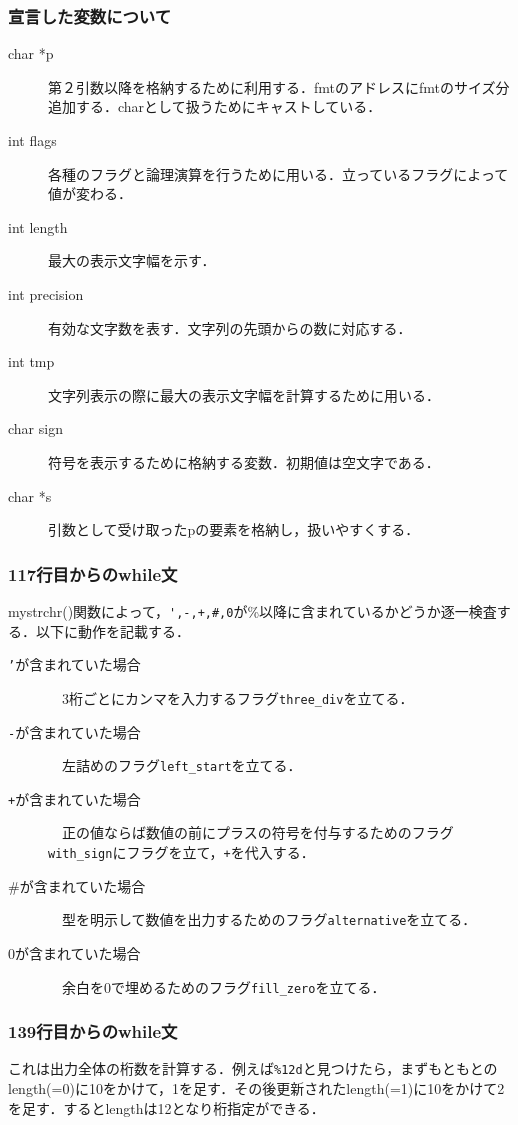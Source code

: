 \documentclass[a4j,11pt]{jarticle}
\begin{document}
\subsubsection{宣言した変数について}
\begin{description}
\item[char *p] 第２引数以降を格納するために利用する．fmtのアドレスにfmtのサイズ分追加する．charとして扱うためにキャストしている．
\item[int flags] 各種のフラグと論理演算を行うために用いる．立っているフラグによって値が変わる．
\item[int length] 最大の表示文字幅を示す．
\item[int precision] 有効な文字数を表す．文字列の先頭からの数に対応する．
\item[int tmp] 文字列表示の際に最大の表示文字幅を計算するために用いる．
\item[char sign] 符号を表示するために格納する変数．初期値は空文字である．
\item[char *s] 引数として受け取ったpの要素を格納し，扱いやすくする．    
\end{description}
\subsubsection{117行目からのwhile文}
mystrchr()関数によって，\verb|',-,+,#,0|が\%以降に含まれているかどうか逐一検査する．以下に動作を記載する．
\begin{description}
  \item[\texttt{'}が含まれていた場合]　3桁ごとにカンマを入力するフラグ\verb|three_div|を立てる．
  \item[\texttt{-}が含まれていた場合]　左詰めのフラグ\verb|left_start|を立てる．
  \item[\texttt{+}が含まれていた場合]　正の値ならば数値の前にプラスの符号を付与するためのフラグ\verb|with_sign|にフラグを立て，\texttt{+}を代入する．
  \item[\#が含まれていた場合]　型を明示して数値を出力するためのフラグ\verb|alternative|を立てる．
  \item[0が含まれていた場合]　余白を0で埋めるためのフラグ\verb|fill_zero|を立てる．
\end{description}
\subsubsection{139行目からのwhile文}
これは出力全体の桁数を計算する．例えば\verb|%12d|と見つけたら，まずもともとのlength(=0)に10をかけて，1を足す．その後更新されたlength(=1)に10をかけて2を足す．するとlengthは12となり桁指定ができる．
\end{document}
